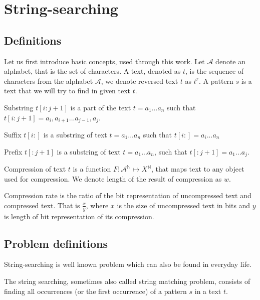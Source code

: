 \section{String-searching}

\subsection{Definitions}
Let us first introduce basic concepts, used through this work. Let $\mathcal{A}$ denote an alphabet, that is the set of characters. A text, denoted as $t$, is the sequence of characters from the alphabet $\mathcal{A}$, we denote reversed text $t$ as $t^r$. A pattern $s$ is a text that we will try to find in given text $t$.

\begin{definition}
     Substring $t[i: j+1]$ is a part of the text $t = a_1...a_n$ such that $t[i : j+1] = a_i,a_{i+1}...a_{j-1},a_j$.
\end{definition}

\begin{definition}
     Suffix $t[i:]$ is a substring of text $t = a_1...a_n$ such that $t[i:] = a_i...a_n$
\end{definition}

\begin{definition}
    Prefix $t[:j+1]$ is a substring of text $t = a_1...a_n$, such that $t[:j+1] = a_1...a_j$. 
\end{definition}

\begin{definition}
    Compression of text $t$ is a function $F: \mathcal{A}^\mathbb{N} \mapsto X^\mathbb{N}$, that maps text to any object used for compression. We denote length of the result of compression as $w$.
\end{definition}

\begin{definition}
    Compression rate is the ratio of the bit representation of uncompressed text and compressed text. That is $\frac{x}{y}$, where $x$ is the size of uncompressed text in bits and $y$ is length of bit representation of its compression.
\end{definition}

\subsection{Problem definitions}
String-searching is well known problem which can also be found in everyday life.
\begin{problem} \cite{stringSearchingDef} 
 The string searching, sometimes also called string matching problem, consists of finding all occurrences (or the first  occurrence) of a pattern $s$ in a text $t$.
\end{problem}

